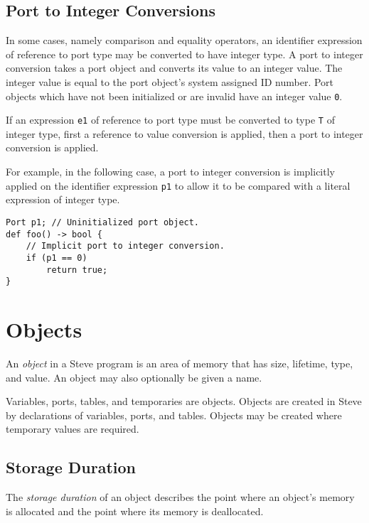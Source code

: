 \subsection{Port to Integer Conversions} \label{port_conv}

In some cases, namely comparison and equality operators, an identifier expression of reference to port type may be converted to have integer type. A port to integer conversion takes a port object and converts its value to an integer value. The integer value is equal to the port object's system assigned ID number. Port objects which have not been initialized or are invalid have an integer value \texttt{0}.

If an expression \texttt{e1} of reference to port type must be converted to type \texttt{T} of integer type, first a reference to value conversion is applied, then a port to integer conversion is applied.

For example, in the following case, a port to integer conversion is implicitly applied on the identifier expression \texttt{p1} to allow it to be compared with a literal expression of integer type.

\begin{minip}
\begin{lstlisting}
Port p1; // Uninitialized port object.
def foo() -> bool {
	// Implicit port to integer conversion.
	if (p1 == 0)
		return true;
}
\end{lstlisting}
\end{minip}

\section{Objects} \label{object_guide}

An \textit{object} in a Steve program is an area of memory that has size, lifetime, type, and value. An object may also optionally be given a name.

Variables, ports, tables, and temporaries are objects. Objects are created in Steve by declarations of variables, ports, and tables. Objects may be created where temporary values are required.

\subsection{Storage Duration} \label{storage_guide}

The \textit{storage duration} of an object describes the point where an object's memory is allocated and the point where its memory is deallocated.

